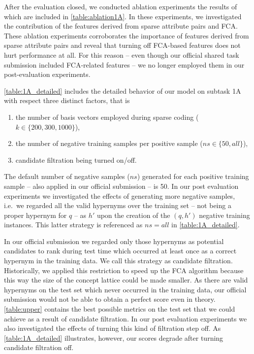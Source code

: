 \documentclass[11pt,a4paper]{article}
\begin{document}




After the evaluation closed, we conducted ablation experiments the results of 
which are included in
\autoref{table:ablation1A}. In these experiments, we investigated the 
contribution of the features derived from sparse attribute pairs and FCA.
These ablation experiments corroborates the importance of features derived 
from sparse attribute pairs and reveal that turning off FCA-based features 
does not hurt performance at all. For this reason -- even though our official 
shared task submission included FCA-related features -- we no longer employed 
them in our post-evaluation experiments.

\autoref{table:1A_detailed} includes the detailed behavior of our model on 
subtask 1A with respect three distinct factors, that is
\begin{enumerate}
	\item the number of basis vectors employed during sparse coding ($k \in 
	\{200, 300, 1000\}$),
	\item the number of negative training samples per positive sample ($ns 
	\in \{50, all\}$),
	\item candidate filtration being turned on/off.
\end{enumerate}
The default number of negative samples ($ns$) generated for
each positive training sample -- also applied in our official submission -- is 
50. In our post evaluation experiments we investigated the effects of 
generating more negative samples, i.e.~we regarded all the valid hypernyms over 
the training set -- not being a
proper hypernym for $q$ -- as $h'$ upon the creation of the $(q, h')$ negative 
training instances. This latter strategy is referenced as $ns=all$ in 
\autoref{table:1A_detailed}.

In our official submission we regarded only those hypernyms as potential 
candidates to rank during test time which occurred at least once as a correct 
hypernym in the training data. We call this strategy as candidate filtration. 
Historically, we applied this restriction to speed up the FCA algorithm because 
this way the size of the concept lattice could be made smaller.
As there are valid hypernyms on the test set which never occurred in the 
training data, our official submission would not be able to obtain a perfect 
score even in theory. \autoref{table:upper} contains the best possible metrics 
on the test set that we could achieve as a result of candidate filtration. In 
our post evaluation experiments we also investigated the effects of turning 
this kind of filtration step off. As \autoref{table:1A_detailed} illustrates, 
however, our scores degrade after turning candidate filtration off.
\end{document}
